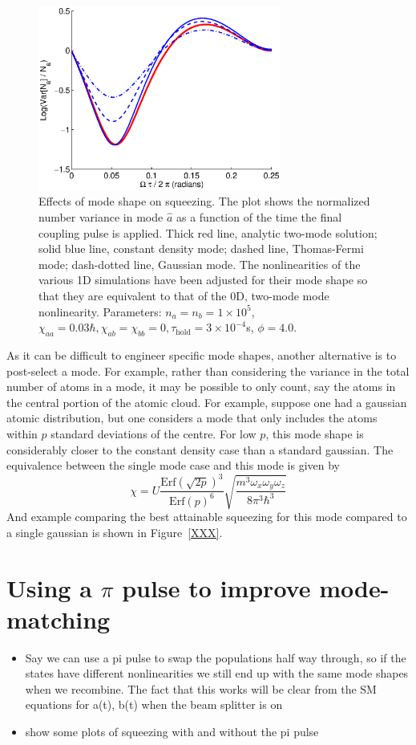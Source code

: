 \documentclass{iopart}
\begin{document}
\begin{figure}
    \centering
    \includegraphics[width=8cm]{figures/modal_squeezing_effects_1D.eps}
    \caption{Effects of mode shape on squeezing. The plot shows the normalized number variance in mode $\hat{a}$ as a function of the time the final coupling pulse is applied. Thick red line, analytic two-mode solution; solid blue line, constant density mode; dashed line, Thomas-Fermi mode; dash-dotted line, Gaussian mode. The nonlinearities of the various 1D simulations have been adjusted for their mode shape so that they are equivalent to that of the 0D, two-mode mode nonlinearity. Parameters: $n_a = n_b =1 \times 10^5$, $\chi_{aa}=0.03 \hbar, \chi_{ab}=\chi_{bb}=0, \tau_{\mathrm{hold}}=3\times 10^{-4}$s, $\phi=4.0$. }
    \label{figModalSqueezingEffects1D}
\end{figure}

As it can be difficult to engineer specific mode shapes, another alternative is to post-select a mode. For example, rather than considering the variance in the total number of atoms in a mode, it may be possible to only count, say the atoms in the central portion of the atomic cloud. For example, suppose one had a gaussian atomic distribution, but one considers a mode that only includes the atoms within $p$ standard deviations of the centre. For low $p$, this mode shape is considerably closer to the constant density case than a standard gaussian. The equivalence between the single mode case and this mode is given by
\begin{equation}
\chi = U \frac{{\mathrm{Erf}} (\sqrt{2p})^3}{{\mathrm{Erf}}(p)^6} \sqrt{\frac{m^3 \omega_x \omega_y \omega_z}{8 \pi^3 \hbar^3}}
\end{equation}
And example comparing the best attainable squeezing for this mode compared to a single gaussian is shown in Figure~\ref{XXX}.


\section{Using a $\pi$ pulse to improve mode-matching}
\begin{itemize}
  \item Say we can use a pi pulse to swap the populations half way through, so if the states have different nonlinearities we still end up with the same mode shapes when we recombine. The fact that this works will be clear from the SM equations for a(t), b(t) when the beam splitter is on
  \item show some plots of squeezing with and without the pi pulse
\end{itemize}
\end{document}
